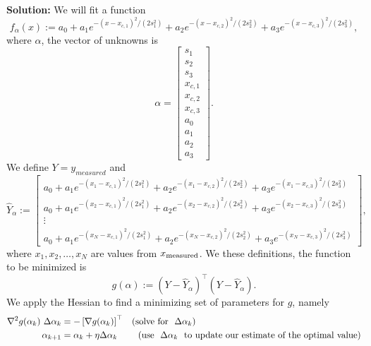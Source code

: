 \textbf{Solution:} We will fit a function 
\begin{equation}
    f_{\alpha}(x):= a_0 + a_1  e^{-(x-x_{c,1})^2 / (2s_1^2)} +  a_2  e^{-(x-x_{c,2})^2 / (2s_2^2)} +  a_3  e^{-(x-x_{c,3})^2 / (2s_3^2)},
\end{equation}
where $\alpha$, the vector of unknowns is
\begin{equation}
    \alpha = \left[
\begin{array}{c}
s_1\\ s_2 \\s_3\\ x_{c,1} \\x_{c,2} \\ x_{c,3}\\ a_0 \\a_1 \\a_2 \\a_3
\end{array} \right].
\end{equation}
We define $Y=y_{measured}$ and 
\begin{equation}
    \widehat{Y}_\alpha:= \left[ \begin{array}{c} 
    a_0 + a_1  e^{-(x_1-x_{c,1})^2 / (2s_1^2)} +  a_2  e^{-(x_1-x_{c,2})^2 / (2s_2^2)} +  a_3  e^{-(x_1-x_{c,3})^2 / (2s_3^2)} \\
        a_0 + a_1  e^{-(x_2-x_{c,1})^2 / (2s_1^2)} +  a_2  e^{-(x_2-x_{c,2})^2 / (2s_2^2)} +  a_3  e^{-(x_2-x_{c,3})^2 / (2s_3^2)} \\
    \vdots \\
    a_0 + a_1  e^{-(x_N-x_{c,1})^2 / (2s_1^2)} +  a_2  e^{-(x_N-x_{c,2})^2 / (2s_2^2)} +  a_3  e^{-(x_N-x_{c,3})^2 / (2s_3^2)}
\end{array}
\right],
\end{equation}
where $x_1, x_2, \ldots, x_N$ are values from $x_{\rm measured}$. We these definitions, the function to be minimized is 
\begin{equation}
    g(\alpha):= (Y- \widehat{Y}_\alpha)^\top (Y- \widehat{Y}_\alpha).
\end{equation}
We apply the Hessian to find a minimizing set of parameters for $g$, namely
\begin{align}
\label{eq:NewtonRaphsonOptimizationStep1b}
\nabla^2 g(\alpha_k)~ \Delta \alpha_{k} &= - \left[\nabla g(\alpha_k) \right]^\top \hspace*{0.3cm}(\text{solve for}~~\Delta \alpha_k)  \\
\label{eq:NewtonRaphsonOptimizationStep2b}
\alpha_{k+1}&= \alpha_k + \eta \Delta\alpha_{k}~~\hspace*{0.57cm}(\text{use~~} \Delta \alpha_k ~~\text{to update our estimate of the optimal value})
\end{align}
